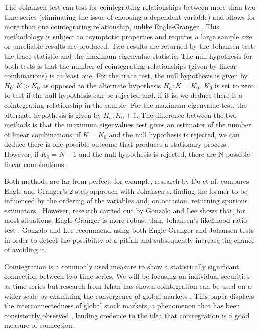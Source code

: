 \documentclass{UoYCSproject}
\begin{document}
The Johansen test can test for cointegrating relationships between more than two time series (eliminating the issue of choosing a dependent variable) and allows for more than one cointegrating relationship, unlike Engle-Granger \parencite{johansen}. This methodology is subject to asymptotic properties and requires a large sample size or unreliable results are produced. Two results are returned by the Johansen test: the trace statistic and the maximum eigenvalue statistic. The null hypothesis for both tests is that the number of cointegrating relationships (given by linear combinations) is at least one. For the trace test, the null hypothesis is given by $H_0: K > K_0$ as opposed to the alternate hypothesis $H_a: K = K_0$. $K_0$ is set to zero to test if the null hypothesis can be rejected and, if it is, we deduce there is a cointegrating relationship in the sample. For the maximum eigenvalue test, the alternate hypothesis is given by $H_a: K_0 + 1$. The difference between the two methods is that the maximum eigenvalues test gives an estimator of the number of linear combinations: if $K = K_0$ and the null hypothesis is rejected, we can deduce there is one possible outcome that produces a stationary process. However, if $K_0 = N - 1$ and the null hypothesis is rejected, there are N possible linear combinations.

Both methods are far from perfect, for example, research by Do et al. compares Engle and Granger’s 2-step approach with Johansen’s, finding the former to be influenced by the ordering of the variables and, on occasion, returning spurious estimators \parencite{cointcompared}. However, research carried out by Gonzalo and Lee shows that, for most situations, Engle-Granger is more robust than Johansen's likelihood ratio test \parencite{englegrangerjohansen}. Gonzalo and Lee recommend using both Engle-Granger and Johansen tests in order to detect the possibility of a pitfall and subsequently increase the chance of avoiding it.

Cointegration is a commonly used measure to show a statistically significant connection between two time series. We will be focusing on individual securities as time-series but research from Khan has shown cointegration can be used on a wider scale by examining the convergence of global markets \parencite{khancointegration}. This paper displays the interconnectedness of global stock markets, a phenomenon that has been consistently observed \parencite{interconnectedness} \parencite{topical} \parencite{global}, lending credence to the idea that cointegration is a good measure of connection.
\end{document}
